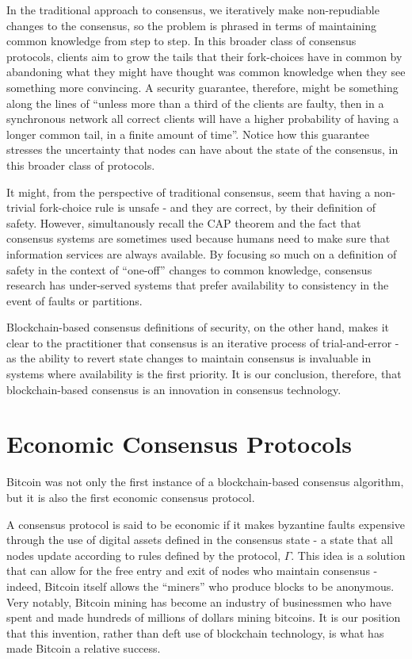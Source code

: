 \documentclass[11pt,a4paper]{article}
\theoremstyle{plain}
\theoremstyle{definition}
\begin{document}
In the traditional approach to consensus, we iteratively make non-repudiable changes to the consensus, so the problem is phrased in terms of maintaining common knowledge from step to step. In this broader class of consensus protocols, clients aim to grow the tails that their fork-choices have in common by abandoning what they might have thought was common knowledge when they see something more convincing. A security guarantee, therefore, might be something along the lines of ``unless more than a third of the clients are faulty, then in a synchronous network all correct clients will have a higher probability of having a longer common tail, in a finite amount of time''. Notice how this guarantee stresses the uncertainty that nodes can have about the state of the consensus, in this broader class of protocols.

It might, from the perspective of traditional consensus, seem that having a non-trivial fork-choice rule is unsafe - and they are correct, by their definition of safety. However, simultanously recall the CAP theorem and the fact that consensus systems are sometimes used because humans need to make sure that information services are always available. By focusing so much on a definition of safety in the context of ``one-off'' changes to common knowledge, consensus research has under-served systems that prefer availability to consistency in the event of faults or partitions. 

Blockchain-based consensus definitions of security, on the other hand, makes it clear to the practitioner that consensus is an iterative process of trial-and-error - as the ability to revert state changes to maintain consensus is invaluable in systems where availability is the first priority. It is our conclusion, therefore, that blockchain-based consensus is an innovation in consensus technology.


\section{Economic Consensus Protocols} 

Bitcoin was not only the first instance of a blockchain-based consensus algorithm, but it is also the first economic consensus protocol.

A consensus protocol is said to be economic if it makes byzantine faults expensive through the use of digital assets defined in the consensus state - a state that all nodes update according to rules defined by the protocol, $\Gamma$. This idea is a solution that can allow for the free entry and exit of nodes who maintain consensus - indeed, Bitcoin itself allows the ``miners'' who produce blocks to be anonymous. Very notably, Bitcoin mining has become an industry of businessmen who have spent and made hundreds of millions of dollars mining bitcoins. It is our position that this invention, rather than deft use of blockchain technology, is what has made Bitcoin a relative success.
\end{document}
